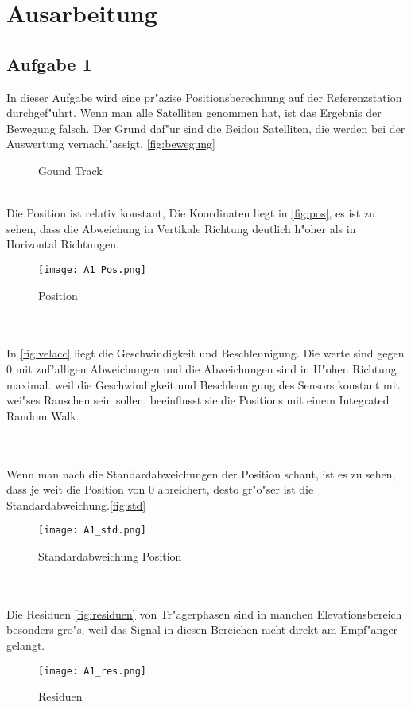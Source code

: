\chapter{Ausarbeitung}
\section{Aufgabe 1}
In dieser Aufgabe wird eine pr"azise Positionsberechnung auf der Referenzstation durchgef"uhrt. Wenn man alle Satelliten genommen hat, ist das Ergebnis der Bewegung falsch. Der Grund daf"ur sind die Beidou Satelliten, die werden bei der Auswertung vernachl"assigt. \autoref{fig:bewegung}
\begin{figure}[ht]\centering 
	\caption{Gound Track}
	\label{fig:bewegung}
\end{figure}\\
Die Position ist relativ konstant, Die Koordinaten liegt in \autoref{fig:pos}, es ist zu sehen, dass die Abweichung in Vertikale Richtung deutlich h"oher als in Horizontal Richtungen. 
\begin{figure}[ht]\centering 
	\texttt{[image: A1\_Pos.png]}
	\caption{Position}
	\label{fig:pos}
\end{figure}\\\\
In \autoref{fig:velacc} liegt die Geschwindigkeit und Beschleunigung. Die werte sind gegen 0 mit zuf"alligen Abweichungen und die Abweichungen sind in H"ohen Richtung maximal. weil die Geschwindigkeit und Beschleunigung des Sensors konstant mit wei"ses Rauschen sein sollen, beeinflusst sie die Positions mit einem Integrated Random Walk.  
\begin{figure}[ht]\centering 
	\caption{}
	\label{fig:velacc}
\end{figure}\\\\
Wenn man nach die Standardabweichungen der Position schaut, ist es zu sehen, dass je weit die Position von 0 abreichert, desto gr"o"ser ist die Standardabweichung.\autoref{fig:std}
\begin{figure}[ht]\centering 
	\texttt{[image: A1\_std.png]}
	\caption{Standardabweichung Position}
	\label{fig:std}
\end{figure}\\\\
Die Residuen \autoref{fig:residuen} von Tr"agerphasen sind in manchen Elevationsbereich besonders gro"s, weil das Signal in diesen Bereichen nicht direkt am Empf"anger gelangt. 
\begin{figure}[ht]\centering 
	\texttt{[image: A1\_res.png]}
	\caption{Residuen}
	\label{fig:residuen}
\end{figure}
\clearpage


